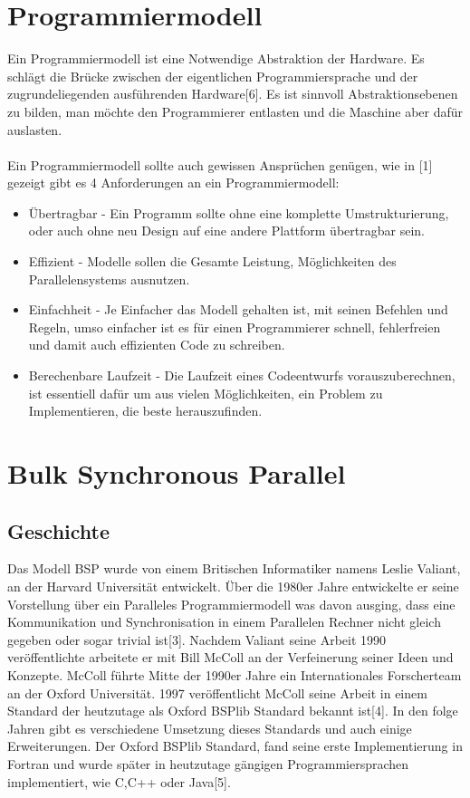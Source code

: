 \documentclass[a4paper,10pt]{scrartcl}
\begin{document}
\section{Programmiermodell}
Ein Programmiermodell ist eine Notwendige Abstraktion der Hardware. Es schlägt die Brücke zwischen der eigentlichen Programmiersprache und der zugrundeliegenden ausführenden Hardware[6]. Es ist sinnvoll Abstraktionsebenen zu bilden, man möchte den Programmierer entlasten und die Maschine aber dafür auslasten.
\\
\\
Ein Programmiermodell sollte auch gewissen Ansprüchen genügen, wie in [1] gezeigt gibt es 4 Anforderungen an ein Programmiermodell:
\begin{itemize}
\item Übertragbar - Ein Programm sollte ohne eine komplette Umstrukturierung, oder auch ohne neu Design auf eine andere Plattform übertragbar sein.
\item Effizient - Modelle sollen die Gesamte Leistung, Möglichkeiten des Parallelensystems ausnutzen.
\item Einfachheit - Je Einfacher das Modell gehalten ist, mit seinen Befehlen und Regeln, umso einfacher ist es für einen Programmierer schnell, fehlerfreien und damit auch effizienten Code zu schreiben.
\item Berechenbare Laufzeit - Die Laufzeit eines Codeentwurfs vorauszuberechnen, ist essentiell dafür um aus vielen Möglichkeiten, ein Problem zu Implementieren, die beste herauszufinden.
\end{itemize}

\section{Bulk Synchronous Parallel}
\subsection{Geschichte}
Das Modell BSP wurde von einem Britischen Informatiker namens Leslie Valiant, an der Harvard Universität entwickelt. Über die 1980er Jahre entwickelte er seine Vorstellung über ein Paralleles Programmiermodell was davon ausging, dass eine Kommunikation und Synchronisation in einem Parallelen Rechner nicht gleich gegeben oder sogar trivial ist[3]. Nachdem Valiant seine Arbeit 1990 veröffentlichte arbeitete er mit Bill McColl an der Verfeinerung seiner Ideen und Konzepte. 
McColl führte Mitte der 1990er Jahre ein Internationales Forscherteam an der Oxford Universität. 1997 veröffentlicht McColl seine Arbeit in einem Standard der heutzutage als Oxford BSPlib Standard bekannt ist[4]. In den folge Jahren gibt es verschiedene Umsetzung dieses Standards und auch einige Erweiterungen. Der Oxford BSPlib Standard, fand seine erste Implementierung in Fortran und wurde später in heutzutage gängigen Programmiersprachen implementiert, wie C,C++ oder Java[5].
\end{document}
